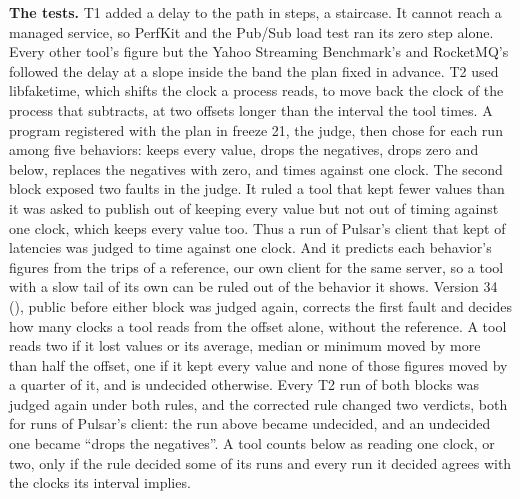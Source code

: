 \documentclass[10pt,journal,onecolumn]{IEEEtran}
\begin{document}
\textbf{The tests.} T1 added a delay to the path in steps, a staircase. It cannot reach a managed
service, so PerfKit and the Pub/Sub load test ran its zero step alone. Every other tool's figure
but the Yahoo Streaming Benchmark's and RocketMQ's followed the delay at a slope inside the band the
plan fixed in advance. T2 used libfaketime, which shifts the clock a process reads, to move back the
clock of the process that subtracts, at two offsets longer than the interval the tool times. A
program registered with the plan in freeze 21, the judge, then chose for each run among five
behaviors: keeps every value, drops the negatives, drops zero and below, replaces the negatives with
zero, and times against one clock. The second block exposed two faults in the judge. It ruled a tool
that kept fewer values than it was asked to publish out of keeping every value but not out of timing
against one clock, which keeps every value too. Thus a run of Pulsar's client that kept
\toolsPulsarOneClockKept{} of \toolsAskedToSend{} latencies was judged to time against one clock.
And it predicts each behavior's figures from the trips of a reference, our own client for the same
server, so a tool with a slow tail of its own can be ruled out of the behavior it shows. Version 34
(), public before either block was judged again, corrects the first
fault and decides how many clocks a tool reads from the offset alone, without the reference. A tool
reads two if it lost values or its average, median or minimum moved by more than half the offset,
one if it kept every value and none of those figures moved by a quarter of it, and is undecided
otherwise. Every T2 run of both blocks was judged again under both rules, and the corrected rule
changed two verdicts, both for runs of Pulsar's client: the run above became undecided, and an
undecided one became ``drops the negatives''. A tool counts below as reading one clock, or two, only
if the rule decided some of its runs and every run it decided agrees with the clocks its interval
implies.
\end{document}
